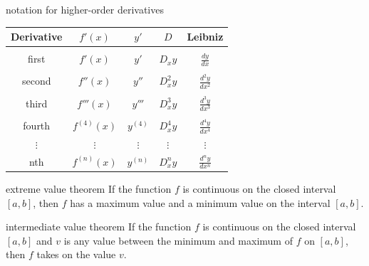 \documentclass[avery5371,grid]{flashcards}
\begin{document}
\begin{flashcard}[Definition]{notation for higher-order derivatives}
\begin{center}
\begin{footnotesize}
\begin{tabular}{ccccc}
Derivative & $f'(x)$ & $y'$ & $D$ & Leibniz \\ \hline
\\
first &  $f'(x)$ & $y'$ & $D_{x}y$ &  $\frac{dy}{dx}$\\
\\
second &  $f''(x)$ & $y''$ & $D_{x}^{2}y$ &  $\frac{d^{2}\! y}{dx^{2}}$\\
\\
third &  $f'''(x)$ & $y'''$ & $D_{x}^{3}y$ &  $\frac{d^{3}\! y}{dx^{3}}$\\
\\
fourth &  $f^{(4)}(x)$ & $y^{(4)}$ & $D_{x}^{4}y$ &  $\frac{d^{4}\! y}{dx^{4}}$\\
$\vdots$ & $\vdots$ & $\vdots$ & $\vdots$ & $\vdots$ \\
nth &  $f^{(n)}(x)$ & $y^{(n)}$ & $D_{x}^{n}y$ &  $\frac{d^{n}\! y}{dx^{n}}$\\
\end{tabular}
\end{footnotesize}
\end{center}
\end{flashcard}

\begin{flashcard}[Theorem]{extreme value theorem}
If the function $f$ is continuous on the closed interval $[a,b]$,
then $f$ has a maximum value and a minimum value on the interval
$[a,b]$.
\end{flashcard}

\begin{flashcard}[Theorem]{intermediate value theorem}
If the function $f$ is continuous on the closed interval $[a,b]$
and $v$ is any value between the minimum and maximum of $f$ on
$[a,b]$, then $f$ takes on the value $v$.
\end{flashcard}
\end{document}
